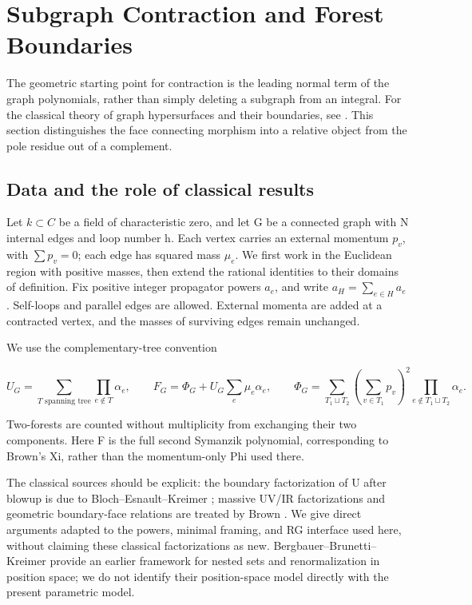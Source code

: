 \documentclass[11pt,a4paper,oneside]{article}
\theoremstyle{plain}
\theoremstyle{definition}
\theoremstyle{remark}
\numberwithin{equation}{section}
\begin{document}
\section{Subgraph Contraction and Forest Boundaries}\label{ch:contraction}

\begingroup

The geometric starting point for contraction is the leading normal term of the graph polynomials, rather than simply deleting a subgraph from an integral. For the classical theory of graph hypersurfaces and their boundaries, see \cite{bek,browncosmic,bbr}. This section distinguishes the face connecting morphism into a relative object from the pole residue out of a complement.

\subsection{Data and the role of classical results}\label{sec:contraction:1}

Let \(k\subset C\) be a field of characteristic zero, and let G be a connected graph with N internal edges and loop number h. Each vertex carries an external momentum \(p_v\), with \(\sum p_v=0\); each edge has squared mass \(\mu _e\). We first work in the Euclidean region with positive masses, then extend the rational identities to their domains of definition. Fix positive integer propagator powers \(a_e\), and write \(a_H=\sum _{e\in H}a_e\). Self-loops and parallel edges are allowed. External momenta are added at a contracted vertex, and the masses of surviving edges remain unchanged.

We use the complementary-tree convention

\begin{equation}
U_G=\sum_{T\text{ spanning tree}}\prod_{e\notin T}\alpha_e,\qquad
 F_G=\Phi_G+U_G\sum_e\mu_e\alpha_e,\qquad
 \Phi_G=\sum_{T_1\sqcup T_2}(\sum_{v\in T_1}p_v)^2
                                  \prod_{e\notin T_1\sqcup T_2}\alpha_e.       \label{eq:contraction:1}
\end{equation}

Two-forests are counted without multiplicity from exchanging their two components. Here F is the full second Symanzik polynomial, corresponding to Brown's Xi, rather than the momentum-only Phi used there.

The classical sources should be explicit: the boundary factorization of U after blowup is due to Bloch--Esnault--Kreimer \cite[Proposition 3.5]{bek}; massive UV/IR factorizations and geometric boundary-face relations are treated by Brown \cite[Proposition 2.2, Theorems 2.7, 6.5, 7.8]{browncosmic}. We give direct arguments adapted to the powers, minimal framing, and RG interface used here, without claiming these classical factorizations as new. Bergbauer--Brunetti--Kreimer \cite{bbr} provide an earlier framework for nested sets and renormalization in position space; we do not identify their position-space model directly with the present parametric model.
\end{document}
